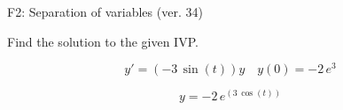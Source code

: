 \begin{exercise}
  \begin{exerciseTitle}F2: Separation of variables (ver. 34)\end{exerciseTitle}
  \begin{exerciseStatement}
    
Find the solution to the given IVP.

    
\[y'=( -3 \, \sin\left(t\right) )y\hspace{1em} y(0)= -2 \, e^{3}\]

  \end{exerciseStatement}
  \begin{exerciseAnswer}
    
\[y= -2 \, e^{\left(3 \, \cos\left(t\right)\right)}\]

  \end{exerciseAnswer}
\end{exercise}